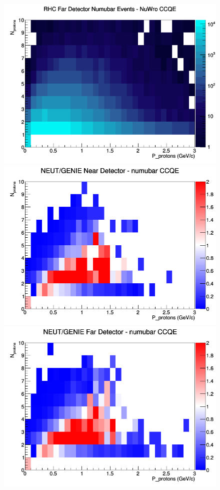\documentclass[12pt]{article}
\begin{document}
\begin{figure}[h]
\endminipage
{}
\includegraphics[width=\linewidth]{N_P/nominal/protons/CCQE_RHC_FD_numubar_N_P_NuWro.png}
\endminipage
\newline
{}
\includegraphics[width=\linewidth]{N_P/nominal/protons/ratios/CCQE_NEUT_GENIE_numubar_near_N_P.png}
\endminipage
{}
\includegraphics[width=\linewidth]{N_P/nominal/protons/ratios/CCQE_NEUT_GENIE_numubar_far_N_P.png}

\end{figure}
\end{document}
